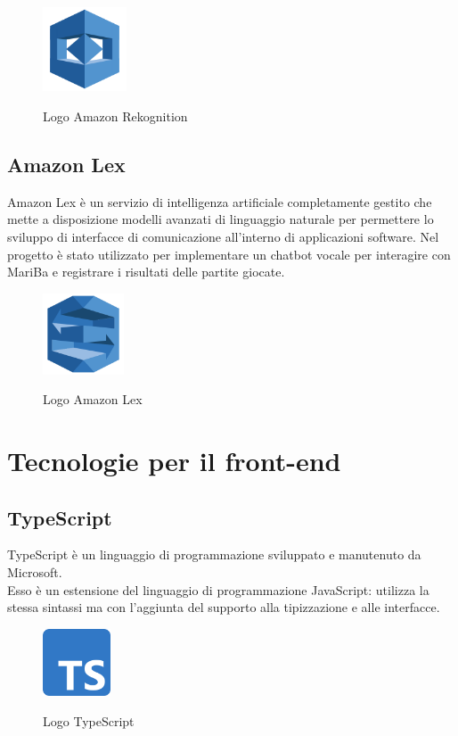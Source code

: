 	\begin{figure}[H]
		\centering
		\includegraphics[width=2.5cm]{immagini/rekognition.png} \\
		\caption{\label{fig:logo_rekognition} Logo Amazon Rekognition}
	\end{figure}
	
	\subsection{Amazon Lex}
	Amazon Lex è un servizio di intelligenza artificiale completamente gestito che mette a disposizione modelli avanzati di linguaggio naturale per permettere lo sviluppo di interfacce di comunicazione all'interno di applicazioni software. Nel progetto è stato utilizzato per implementare un \gls{chatbot} vocale per interagire con MariBa e registrare i risultati delle partite giocate.
	
	\begin{figure}[H]
		\centering
		\includegraphics[width=2.4cm]{immagini/lex.png} \\
		\caption{\label{fig:logo_lex} Logo Amazon Lex}
	\end{figure}

\section{Tecnologie per il front-end}
	\subsection{TypeScript}
	TypeScript è un linguaggio di programmazione sviluppato e manutenuto da Microsoft. \\
	Esso è un estensione del linguaggio di programmazione JavaScript: utilizza la stessa sintassi ma con l'aggiunta del supporto alla tipizzazione e alle interfacce. 
	
	\begin{figure}[H]
		\centering
		\includegraphics[width=2cm]{immagini/typescript.png} \\
		\caption{\label{fig:logo_typescript} Logo TypeScript}
	\end{figure}

